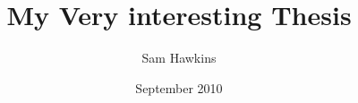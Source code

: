 \documentclass[doublespace]{StyleFiles/jthesis-v1}
\begin{document}
\title{My Very interesting Thesis}
\author{Sam Hawkins}
\date{September 2010}

\maketitle






\contentsandlists




\startchapters









\appendix

%


\end{document}
